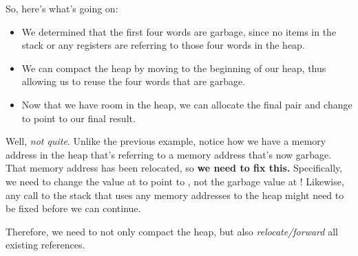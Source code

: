 \documentclass[letterpaper]{article}
\begin{document}
So, here's what's going on: 
\begin{itemize}
    \item We determined that the first four words are garbage, since no items in the stack or any registers are referring to those four words in the heap. 
    \item We can compact the heap by moving  to the beginning of our heap, thus allowing us to reuse the four words that are garbage. 
    \item Now that we have room in the heap, we can allocate the final pair and change  to point to our final result.
\end{itemize}
Well, \emph{not quite}. Unlike the previous example, notice how we have a memory address in the heap that's referring to a memory address that's now garbage. That memory address has been relocated, so \textbf{we need to fix this.} Specifically, we need to change the value at  to point to , not the garbage value at ! Likewise, any call to the stack that uses any memory addresses to the heap might need to be fixed before we can continue. 

\bigskip 

Therefore, we need to not only compact the heap, but also \emph{relocate/forward} all existing references.
\end{document}
